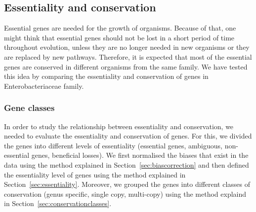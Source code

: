 \documentclass[12pt,letterpaper]{article}
\begin{document}
\subsection{Essentiality and conservation}
Essential genes are needed for the growth of organisms. Because of that, one might think that essential genes should not be lost in a short period of time throughout evolution, unless they are no longer needed in new organisms or they are replaced by new pathways. Therefore, it is expected that most of the essential genes are conserved in different organisms from the same family. We have tested this idea by comparing the essentiality and conservation of genes in Enterobacteriaceae family.


\subsubsection{Gene classes}
In order to study the relationship between essentiality and conservation, we needed to evaluate the essentiality and conservation of genes. For this, we divided the genes into different levels of essentiality (essential genes, ambiguous, non-essential genes, beneficial losses). We first normalised the biases that exist in the data using the method explained in Section~\ref{sec:biascorrection} and then defined the essentiality level of genes using the method explained in Section~\ref{sec:essentiality}. Moreover, we grouped the genes into different classes of conservation (genus specific, single copy, multi-copy) using the method explaind in Section~\ref{sec:conservationclasses}.
\end{document}
